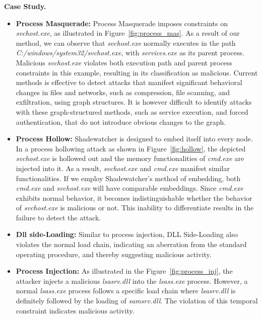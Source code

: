 \textbf{Case Study.}
\begin{itemize}
    \item \textbf{Process Masquerade:} Process Masquerade imposes constraints on \textit{svchost.exe}, as illustrated in Figure~\ref{fig:process_mas}. As a result of our method, we can observe that \textit{svchost.exe} normally executes in the path \textit{C:/windows/system32/svchost.exe}, with \textit{services.exe} as its parent process. Malicious \textit{svchost.exe} violates both execution path and parent process constraints in this example, resulting in its classification as malicious. Current methods \cite{wang2022threatrace} is effective to detect attacks that manifest significant behavioral changes in files and networks, such as compression, file scanning, and exfiltration, using graph structures. It is however difficult to identify attacks with these graph-structured methods, such as service execution, and forced authentication, that do not introduce obvious changes to the graph. 
    \item \textbf{Process Hollow:} Shadewatcher is designed to embed itself into every node. In a process hollowing attack as shown in Figure~\ref{fig:hollow}, the depicted \textit{svchost.exe} is hollowed out and the memory functionalities of \textit{cmd.exe} are injected into it. As a result, \textit{svchost.exe} and \textit{cmd.exe} manifest similar functionalities. If we employ Shadewatcher's method of embedding, both \textit{cmd.exe} and \textit{svchost.exe} will have comparable embeddings. Since \textit{cmd.exe} exhibits normal behavior, it becomes indistinguishable whether the behavior of \textit{svchost.exe} is malicious or not. This inability to differentiate results in the failure to detect the attack.
    \item \textbf{Dll side-Loading:} Similar to process injection, DLL Side-Loading also violates the normal load chain, indicating an aberration from the standard operating procedure, and thereby suggesting malicious activity.
    \item \textbf{Process Injection:} As illustrated in the Figure~\ref{fig:process_inj}, the attacker injects a malicious \textit{lsasrv.dll} into the \textit{lsass.exe} process. However, a normal \textit{lsass.exe} process follows a specific load chain where \textit{lsasrv.dll} is definitely followed by the loading of \textit{samsrv.dll}. The violation of this temporal constraint indicates malicious activity.
\end{itemize}



